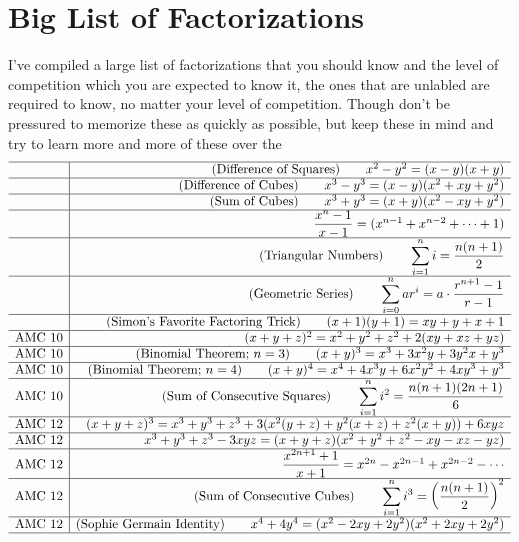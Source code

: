 \documentclass[11pt]{article}
\begin{document}
\section{Big List of Factorizations}
I've compiled a large list of factorizations that you should know and the level of competition which you are expected to know it, the ones that are unlabled are required to know, no matter your level of competition.
Though don't be pressured to memorize these as quickly as possible, but keep these in mind and try to learn more and more of these over the 
\newline
\[
\begin{array}{r|r}
    \hline
    & (\text{Difference of Squares}) \qquad x^2-y^2 = (x-y)(x+y) \\
    \hline
    & (\text{Difference of Cubes})\qquad x^3-y^3 = (x-y)(x^2+xy+y^2) \\
    \hline
    & (\text{Sum of Cubes}) \qquad x^3+y^3 = (x+y)(x^2-xy + y^2) \\
    \hline
    & \dfrac{x^n-1}{x-1} = (x^{n-1}+x^{n-2}+\cdots+1) \\
    \hline
    & (\text{Triangular Numbers}) \qquad \displaystyle \sum_{i=1}^n i = \dfrac{n(n+1)}{2} \\
   \hline  
    & (\text{Geometric Series}) \qquad \displaystyle \sum_{i=0}^n ar^i = a \cdot \dfrac{r^{n+1}-1}{r-1} \\
    \hline
    & (\text{Simon's Favorite Factoring Trick}) \qquad (x+1)(y+1) = xy+y+x+1 \\
    \hline
   \text{AMC 10} &   (x+y+z)^2 = x^2+y^2+z^2+2(xy+xz+yz) \\
   \hline
   \text{AMC 10} & (\text{Binomial Theorem; } n=3)  \qquad (x+y)^3= x^3 + 3x^2y + 3y^2x + y^3 \\
   \hline
   \text{AMC 10} & (\text{Binomial Theorem; } n=4) \qquad (x+y)^4 = x^4+4x^3y + 6x^2y^2 + 4xy^3 + y^3 \\
   \hline
   \text{AMC 10} & (\text{Sum of Consecutive Squares}) \qquad \displaystyle \sum_{i=1}^n i^2 = \dfrac{n(n+1)(2n+1)}{6} \\
    \hline
    \text{AMC 12} & (x+y+z)^3 = x^3+y^3+z^3 + 3(x^2(y+z)+y^2(x+z)+z^2(x+y))+6xyz \\
    \hline
    \text{AMC 12} & x^3+y^3+z^3 - 3xyz = (x+y+z)(x^2+y^2+z^2-xy-xz-yz) \\
    \hline
    \text{AMC 12}&  \dfrac{x^{2n+1}+1}{x+1} = x^{2n} - x^{2n-1} + x^{2n-2} - \cdots \\
    \hline
    \text{AMC 12} & (\text{Sum of Consecutive Cubes}) \qquad \displaystyle \sum_{i=1}^n i^3 = \bigg( \dfrac{n(n+1)}{2} \bigg)^2 \\
    \hline
    \text{AMC 12} & (\text{Sophie Germain Identity}) \qquad  x^4+4y^4 = (x^2-2xy+2y^2)(x^2+2xy+2y^2) \\
    \hline

\end{array}
\]
\end{document}
